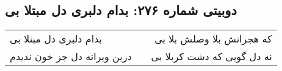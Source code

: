 \begin{center}
\section*{دوبیتی شماره ۲۷۶: بدام دلبری دل مبتلا بی}
\label{sec:276}
\begin{longtable}{l p{0.5cm} r}
بدام دلبری دل مبتلا بی
&&
که هجرانش بلا وصلش بلا بی
\\
درین ویرانه دل جز خون ندیدم
&&
نه دل گویی که دشت کربلا بی
\\
\end{longtable}
\end{center}
